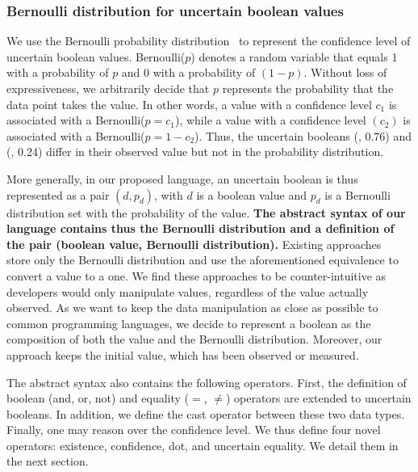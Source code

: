 \subsubsection{Bernoulli distribution for uncertain boolean values}
\label{subsubsec:d-u-repr-ubool}
We use the Bernoulli probability distribution~\cite{walck1996hand} to represent the confidence level of uncertain boolean values.
Bernoulli($p$) denotes a random variable that equals 1 with a probability of $p$ and 0 with a probability of $(1 - p)$.
Without loss of expressiveness, we arbitrarily decide that $p$ represents the probability that the data point takes the \true{} value.
In other words, a \true{} value with a confidence level $c_1$ is associated with a Bernoulli($p = c_1$), while a \false{} value with a confidence level $(c_2)$ is associated with a Bernoulli($p = 1 - c_2$).
Thus, the uncertain booleans (\true{}, 0.76) and (\false{}, 0.24) differ in their observed value but not in the probability distribution.

More generally, in our proposed language, an uncertain boolean is thus represented as a pair $(d, p_d)$, with $d$ is a boolean value and $p_d$ is a Bernoulli distribution set with the probability of the \true{} value.
\textbf{The abstract syntax of our language contains thus the Bernoulli distribution and a definition of the pair (boolean value, Bernoulli distribution).}
Existing approaches~\cite{DBLP:conf/ecmdafa/BertoaMBBTV18} store only the Bernoulli distribution and use the aforementioned equivalence to convert a \false{} value to a \true{} one. 
We find these approaches to be counter-intuitive as developers would only manipulate \true{} values, regardless of the value actually observed.
As we want to keep the data manipulation as close as possible to common programming languages, we decide to represent a boolean as the composition of both the value and the Bernoulli distribution.
Moreover, our approach keeps the initial value, which has been observed or measured.

The abstract syntax also contains the following operators.
First, the definition of boolean (and, or, not) and equality ($=$, $\ne$) operators are extended to uncertain booleans.
In addition, we define the cast operator between these two data types.
Finally, one may reason over the confidence level.
We thus define four novel operators: existence, confidence, dot, and uncertain equality.
We detail them in the next section.

